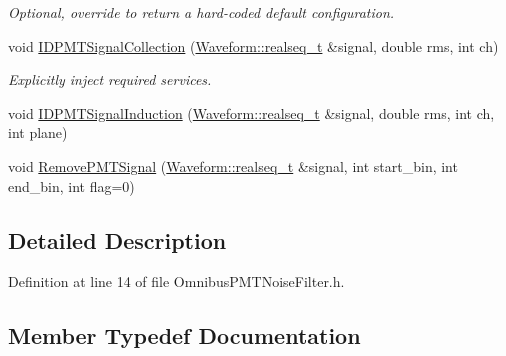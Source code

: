 \begin{DoxyCompactItemize}
\begin{DoxyCompactList}\small\item\em Optional, override to return a hard-\/coded default configuration. \end{DoxyCompactList}\item 
void \hyperlink{class_wire_cell_1_1_sig_proc_1_1_omnibus_p_m_t_noise_filter_a404245bd0dfdbd9447aecb5a19226df4}{I\+D\+P\+M\+T\+Signal\+Collection} (\hyperlink{namespace_wire_cell_1_1_waveform_a479175e541c8545e87cd8063b74b6956}{Waveform\+::realseq\+\_\+t} \&signal, double rms, int ch)
\begin{DoxyCompactList}\small\item\em Explicitly inject required services. \end{DoxyCompactList}\item 
void \hyperlink{class_wire_cell_1_1_sig_proc_1_1_omnibus_p_m_t_noise_filter_af007f96c1c669926b51dce67928fbf60}{I\+D\+P\+M\+T\+Signal\+Induction} (\hyperlink{namespace_wire_cell_1_1_waveform_a479175e541c8545e87cd8063b74b6956}{Waveform\+::realseq\+\_\+t} \&signal, double rms, int ch, int plane)
\item 
void \hyperlink{class_wire_cell_1_1_sig_proc_1_1_omnibus_p_m_t_noise_filter_a5d53fbe0bbc137cfc1e432b957fbb696}{Remove\+P\+M\+T\+Signal} (\hyperlink{namespace_wire_cell_1_1_waveform_a479175e541c8545e87cd8063b74b6956}{Waveform\+::realseq\+\_\+t} \&signal, int start\+\_\+bin, int end\+\_\+bin, int flag=0)
\end{DoxyCompactItemize}


\subsection{Detailed Description}


Definition at line 14 of file Omnibus\+P\+M\+T\+Noise\+Filter.\+h.



\subsection{Member Typedef Documentation}
\mbox{\label{class_wire_cell_1_1_sig_proc_1_1_omnibus_p_m_t_noise_filter_a8d4cbd8915593acb3881bfd0d380be66}} 
